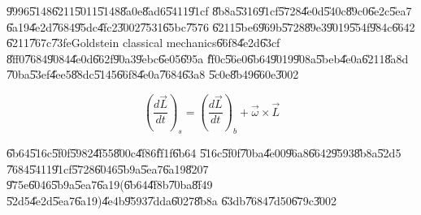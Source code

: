 \documentclass[12pt]{article}
\begin{document}
\U{9996}\U{5148}\U{6211}\U{5011}\U{5148}\U{8a0e}\U{8ad6}\U{5411}\U{91cf}%
\U{8b8a}\U{5316}\U{91cf}\U{5728}\U{4e0d}\U{540c}\U{89c0}\U{6e2c}\U{5ea7}%
\U{6a19}\U{4e2d}\U{7684}\U{95dc}\U{4fc2}\U{3002}\U{7531}\U{65bc}\U{7576}%
\U{6211}\U{5be6}\U{969b}\U{5728}\U{89e3}\U{9019}\U{554f}\U{984c}\U{6642}%
\U{6211}\U{767c}\U{73fe}Goldstein classical mechanics\U{66f8}\U{4e2d}\U{63cf}%
\U{8ff0}\U{7684}\U{9084}\U{4e0d}\U{662f}\U{90a3}\U{9ebc}\U{6e05}\U{695a}%
\U{ff0c}\U{56e0}\U{6b64}\U{9019}\U{908a}\U{5beb}\U{4e0a}\U{6211}\U{8a8d}%
\U{70ba}\U{53ef}\U{4ee5}\U{88dc}\U{5145}\U{66f8}\U{4e0a}\U{7684}\U{63a8}%
\U{5c0e}\U{8b49}\U{660e}\U{3002}

\begin{equation}
\left( \frac{d\vec{L}}{dt}\right) _{s}=\left( \frac{d\vec{L}}{dt}\right)
_{b}+\vec{\omega}\times \vec{L}
\end{equation}

\U{6b64}\U{516c}\U{5f0f}\U{5982}\U{4f55}\U{800c}\U{4f86}\U{ff1f}\U{6b64}%
\U{516c}\U{5f0f}\U{70ba}\U{4e00}\U{96a8}\U{6642}\U{9593}\U{8b8a}\U{52d5}%
\U{7684}\U{5411}\U{91cf}\U{5728}\U{6046}\U{5b9a}\U{5ea7}\U{6a19}\U{8207}%
\U{975e}\U{6046}\U{5b9a}\U{5ea7}\U{6a19}(\U{6b64}\U{4f8b}\U{70ba}\U{8f49}%
\U{52d5}\U{4e2d}\U{5ea7}\U{6a19})\U{4e4b}\U{9593}\U{7dda}\U{6027}\U{8b8a}%
\U{63db}\U{7684}\U{7d50}\U{679c}\U{3002}

\bigskip
\end{document}
